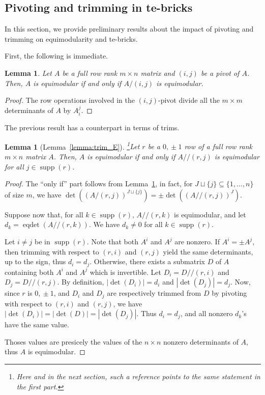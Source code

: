 \documentclass[11pt,a4paper]{amsart}
\newcommand\violet[1]{{\color{violet}\rmfamily#1}}
\theoremstyle{plain}
\newtheorem{corollary}[theorem]{Corollary}
\newtheorem{lemma}[theorem]{Lemma}
\theoremstyle{definition}
\DeclareMathOperator{\supp}{supp}
\DeclareMathOperator{\eqdet}{eqdet}
\begin{document}

\subsection{Pivoting and trimming in te-bricks}

In this section, we provide preliminary results about the impact of pivoting and trimming on equimodularity and te-bricks.

First, the following is immediate.
\begin{lemma}\label{pivotE}
Let $A$ be a full row rank $m\times n$ matrix and $(i,j)$ be a pivot of $A$.
Then, $A$ is equimodular if and only if $A/(i,j)$ is equimodular.
\end{lemma}
\begin{proof} 
The row operations involved in the $(i,j)$-pivot divide all the $m\times m$ determinants of $A$ by $A_i^j$.
\end{proof}
The previous result has a counterpart in terms of trims.
\begin{lemma}[Lemma~\ref{lemma:trim_E}]\footnote{Here and in the next section, such a reference points to the same statement in the first part.}\label{pivoteqE}
Let $r$ be a $0,\!\pm1$ row of a full row rank $m\times n$ matrix $A$.
Then, $A$ is equimodular if and only if $A/\!\!/(r,j)$ is equimodular for all $j\in\supp(r)$.
\end{lemma}
\begin{proof}
The ``only if'' part follows from Lemma~\ref{pivotE}, in fact, for $J\sqcup\{j\}\subseteq \{1,\ldots,n\}$ of size $m$, we have $\det\left(\left(A/(r,j)\right)^{J\sqcup\{j\}}\right)=\pm\det\left(\left(A/\!\!/(r,j)\right)^{J}\right)$.

Suppose now that, for all $k\in\supp(r)$, $A/\!\!/(r,k)$ is equimodular, and let $d_k=\eqdet(A/\!\!/(r,k))$.
We have $d_k\neq 0$ for all $k\in\supp(r)$.

Let $i\neq j$ be in $\supp(r)$.
Note that both $A^i$ and $A^j$ are nonzero.
If $A^i=\pm A^j$, then trimming with respect to $(r,i)$ and $(r,j)$ yield the same determinants, up to the sign, thus $d_i = d_j$.
Otherwise, there exists a submatrix $D$ of $A$ containing both $A^i$ and $A^j$ which is invertible.
Let $D_i=D/\!\!/(r,i)$ and $D_j=D/\!\!/(r,j)$.
By definition, $|\det(D_i)|=d_i$ and $|\det(D_j)|=d_j$.
Now, since $r$ is $0,\!\pm1$, and $D_i$ and $D_j$ are respectively trimmed from $D$ by pivoting with respect to $(r,i)$ and $(r,j)$, we have $|\det(D_i)|=|\det(D)|=|\det(D_j)|$.
Thus $d_i=d_j$, and all nonzero $d_k$'s have the same value.

Thoses values are presicely the values of the $n\times n$ nonzero determinants of $A$, thus $A$ is equimodular.
\end{proof}
\end{document}
